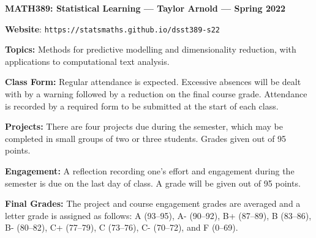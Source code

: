 \documentclass[11pt, a4paper]{article}
\begin{document}
\begin{center}
\textbf{MATH389: Statistical Learning --- Taylor Arnold --- Spring 2022}
\end{center}

\vspace{0.5cm}

\textbf{Website}: \texttt{https://statsmaths.github.io/dsst389-s22}

\bigskip

\textbf{Topics:}
Methods for predictive modelling and dimensionality reduction, with applications
to computational text analysis.

\bigskip

\textbf{Class Form:}
Regular attendance is expected. Excessive absences will be dealt with by a
warning followed by a reduction on the final course grade. Attendance is recorded
by a required form to be submitted at the start of each class.

\bigskip

\textbf{Projects:}
There are four projects due during the semester, which may be completed in small
groups of two or three students. Grades given out of 95 points.

\bigskip

\textbf{Engagement:}
A reflection recording one's effort and engagement during the semester
is due on the last day of class. A grade will be given out of 95 points.

\bigskip

\textbf{Final Grades:}
The project and course engagement grades are averaged and a letter grade
is assigned as follows:
             A (93--95), A- (90--92),
B+ (87--89), B (83--86), B- (80--82),
C+ (77--79), C (73--76), C- (70--72), and F (0--69).
\end{document}

